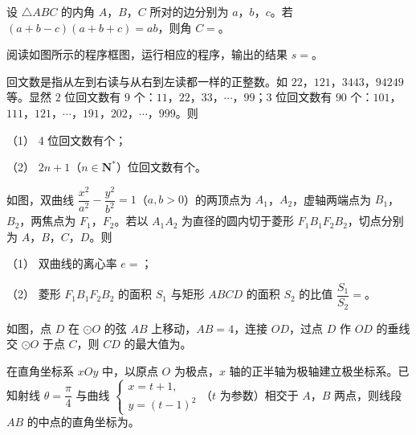 \begin{question}
设 $\triangle ABC$ 的内角 $A$，$B$，$C$ 所对的边分别为 $a$，$b$，$c$。若 $(a+b-c)(a+b+c)=ab$，则角 $C=$\gkblank{}。

\Needspace{0.4\textheight}
\end{question}
\begin{question}
阅读如图所示的程序框图，运行相应的程序，输出的结果 $s=$\gkblank{}。
\nopagebreak[4]
\begin{center}\end{center}
\nopagebreak[4]
\end{question}
\begin{question}
回文数是指从左到右读与从右到左读都一样的正整数。如 $22$，$121$，$3443$，$94249$ 等。显然 $2$ 位回文数有 $9$ 个：$11$，$22$，$33$，$\cdots$，$99$；$3$ 位回文数有 $90$ 个：$101$，$111$，$121$，$\cdots$，$191$，$202$，$\cdots$，$999$。则

（1） 4 位回文数有\gkblank{}个；

（2） $2n+1$（$n\in\mathbf N^*$）位回文数有\gkblank{}个。

\Needspace{0.4\textheight}
\end{question}
\begin{question}
如图，双曲线 $\dfrac{x^2}{a^2}-\dfrac{y^2}{b^2}=1$（$a,b>0$）的两顶点为 $A_1$，$A_2$，虚轴两端点为 $B_1$，$B_2$，两焦点为 $F_1$，$F_2$。若以 $A_1A_2$ 为直径的圆内切于菱形 $F_1B_1F_2B_2$，切点分别为 $A$，$B$，$C$，$D$。则

（1） 双曲线的离心率 $e=$\gkblank{}；

（2） 菱形 $F_1B_1F_2B_2$ 的面积 $S_1$ 与矩形 $ABCD$ 的面积 $S_2$ 的比值 $\dfrac{S_1}{S_2}=$\gkblank{}。
\nopagebreak[4]
\begin{center}\end{center}
\nopagebreak[4]
\Needspace{0.4\textheight}
\end{question}
\begin{question}
如图，点 $D$ 在 $\odot O$ 的弦 $AB$ 上移动，$AB=4$，连接 $OD$，过点 $D$ 作 $OD$ 的垂线交 $\odot O$ 于点 $C$，则 $CD$ 的最大值为\gkblank{}。
\nopagebreak[4]
\begin{center}\end{center}
\nopagebreak[4]
\end{question}
\begin{question}
在直角坐标系 $xOy$ 中，以原点 $O$ 为极点，$x$ 轴的正半轴为极轴建立极坐标系。已知射线 $\theta=\dfrac{\pi}{4}$ 与曲线 $\begin{cases}x=t+1,\\y=(t-1)^2\end{cases}$（$t$ 为参数）相交于 $A$，$B$ 两点，则线段 $AB$ 的中点的直角坐标为\gkblank{}。

\end{question}

